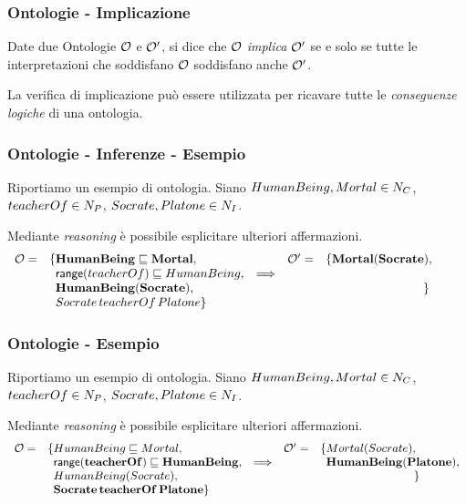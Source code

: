 \documentclass[8pt]{beamer}
\begin{document}
\begin{frame}
  \frametitle{Ontologie - Implicazione}
  Date due Ontologie $\mathcal{O}$ e $\mathcal{O'}$, si dice che 
  $\mathcal{O}$ \emph{implica} $\mathcal{O'}$ se e solo se tutte le interpretazioni
  che soddisfano $\mathcal{O}$ soddisfano anche $\mathcal{O'}$. 
  \vspace{\baselineskip}  
  
  La verifica di implicazione pu\`o essere utilizzata per ricavare
  tutte le \emph{conseguenze logiche} di una ontologia.
  \vspace{\baselineskip}  
\end{frame}

\begin{frame}
\frametitle{Ontologie - Inferenze - Esempio}
Riportiamo un esempio di ontologia. Siano $HumanBeing, Mortal \in N_C$,
$teacherOf \in N_P$, $Socrate, Platone \in N_I$.
\vspace{\baselineskip}

Mediante \emph{reasoning} \`e possibile esplicitare ulteriori 
affermazioni.
\[
 \begin{array}{clccl}
  \Ont  =  &\{\mathbf{HumanBeing \Issub Mortal}, & &\Ontp = & \{\mathbf{Mortal(Socrate)}, \\
  &\phantom{\{}\range(teacherOf) \Issub HumanBeing, & \Longrightarrow&& \phantom{\{HumanBeing(Platone)}\\
  &\phantom{\{}\mathbf{HumanBeing(Socrate)}, &&&\phantom{\{Mortal(Platone)}\}\\
  &\phantom{\{}Socrate\,teacherOf\,Platone \}\\
 \end{array}
\]
\end{frame}

\begin{frame}
\frametitle{Ontologie - Esempio}
Riportiamo un esempio di ontologia. Siano $HumanBeing, Mortal \in N_C$,
$teacherOf \in N_P$, $Socrate, Platone \in N_I$.
\vspace{\baselineskip}

Mediante \emph{reasoning} \`e possibile esplicitare ulteriori 
affermazioni.
\[
 \begin{array}{clccl}
  \Ont  =  &\{HumanBeing \Issub Mortal, & &\Ontp = & \{Mortal(Socrate), \\
  &\phantom{\{}\mathbf{\range(teacherOf) \Issub HumanBeing}, & \Longrightarrow&& \phantom{\}}\mathbf{HumanBeing(Platone)},\\
  &\phantom{\{}HumanBeing(Socrate), &&&\phantom{\{Mortal(Platone)}\}\\
  &\phantom{\{}\mathbf{Socrate\,teacherOf\,Platone} \}\\
 \end{array}
\]
\end{frame}
\end{document}
